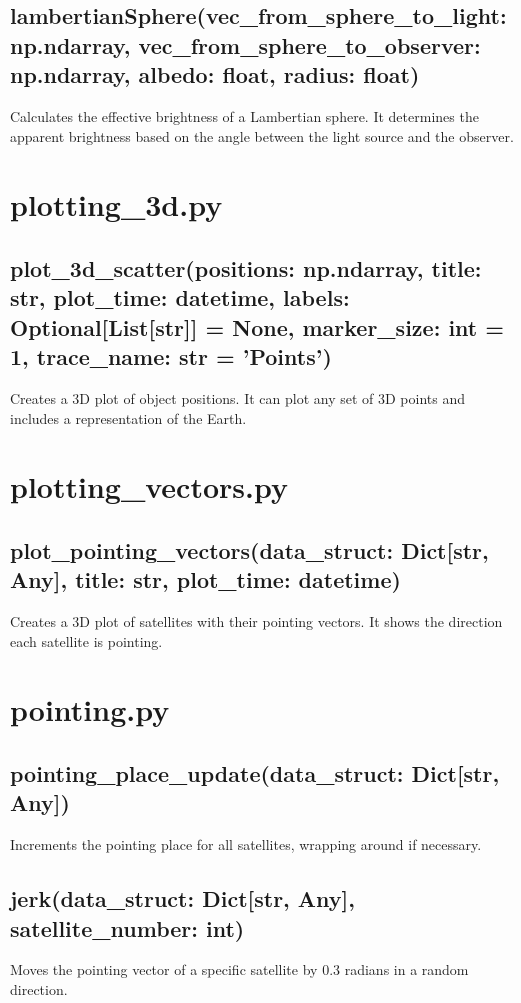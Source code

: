 \documentclass{article}
\begin{document}
\subsection*{lambertianSphere(vec\_from\_sphere\_to\_light: np.ndarray, vec\_from\_sphere\_to\_observer: np.ndarray, albedo: float, radius: float)}
Calculates the effective brightness of a Lambertian sphere. It determines the apparent brightness based on the angle between the light source and the observer.

\section*{plotting\_3d.py}
\subsection*{plot\_3d\_scatter(positions: np.ndarray, title: str, plot\_time: datetime, labels: Optional[List[str]] = None, marker\_size: int = 1, trace\_name: str = 'Points')}
Creates a 3D plot of object positions. It can plot any set of 3D points and includes a representation of the Earth.

\section*{plotting\_vectors.py}
\subsection*{plot\_pointing\_vectors(data\_struct: Dict[str, Any], title: str, plot\_time: datetime)}
Creates a 3D plot of satellites with their pointing vectors. It shows the direction each satellite is pointing.

\section*{pointing.py}
\subsection*{pointing\_place\_update(data\_struct: Dict[str, Any])}
Increments the pointing place for all satellites, wrapping around if necessary.
\subsection*{jerk(data\_struct: Dict[str, Any], satellite\_number: int)}
Moves the pointing vector of a specific satellite by 0.3 radians in a random direction.
\end{document}
